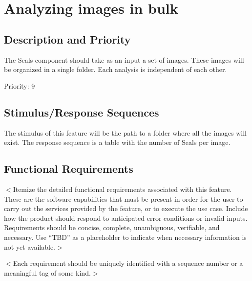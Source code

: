 \documentclass{scrreprt}
\begin{document}
\section{Analyzing images in bulk}

\subsection{Description and Priority}

The Seals component should take as an input a set of images. These images will be
organized in a single folder. Each analysis is independent of each other.

Priority: 9

\subsection{Stimulus/Response Sequences}

The stimulus of this feature will be the path to a folder where all the images 
will exist. The response sequence is a table with the number of Seals per image.

\subsection{Functional Requirements}
$<$Itemize the detailed functional requirements associated with this feature.  
These are the software capabilities that must be present in order for the user 
to carry out the services provided by the feature, or to execute the use case.  
Include how the product should respond to anticipated error conditions or 
invalid inputs. Requirements should be concise, complete, unambiguous, 
verifiable, and necessary. Use “TBD” as a placeholder to indicate when necessary 
information is not yet available.$>$

$<$Each requirement should be uniquely identified with a sequence number or a 
meaningful tag of some kind.$>$
\end{document}
